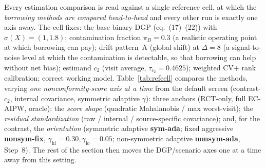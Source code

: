 \documentclass[11pt]{article}
\begin{document}
Every estimation comparison is read against a single reference cell, at which the \emph{borrowing methods are compared head-to-head} and every other run is exactly one axis away. The cell fixes: the base binary DGP (eq.~(17)--(22)) with $\sigma(X){=}(1,1.8)$; contamination fraction $\pi_B{=}0.3$ (a realistic operating point at which borrowing can pay); drift pattern~A (global shift) at $\Delta{=}8$ (a signal-to-noise level at which the contamination is detectable, so that borrowing can help without net bias); estimand $c_2$ (visit average, $\tau_{c_2}{=}0.4625$); weighted CV+ rank calibration; correct working model. Table~\ref{tab:refcell} compares the methods, varying \emph{one nonconformity-score axis at a time} from the default screen (contrast-$c_2$, internal covariance, symmetric adaptive $\gamma$): three anchors (RCT-only, full EC-AIPW, oracle); the \emph{score shape} (quadratic Mahalanobis / max worst-visit); the \emph{residual standardization} (raw / internal / source-specific covariance); and, for the contrast, the \emph{orientation} (symmetric adaptive \textbf{sym-ada}; fixed aggressive \textbf{nonsym-fix}, $\gamma_{\mathrm{hi}}{=}0.30,\gamma_{\mathrm{lo}}{=}0.05$; non-symmetric adaptive \textbf{nonsym-ada}, Step~8). The rest of the section then moves the DGP/scenario axes one at a time away from this setting.
\end{document}
